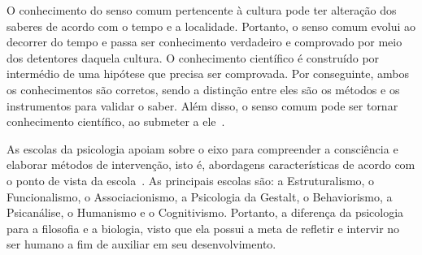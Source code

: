 O conhecimento do senso comum pertencente à cultura pode ter alteração dos saberes de acordo com o tempo e a localidade.
Portanto, o senso comum evolui ao decorrer do tempo e passa ser conhecimento verdadeiro e comprovado por meio dos detentores daquela cultura.
O conhecimento científico é construído por intermédio de uma hipótese que precisa ser comprovada. 
Por conseguinte, ambos os conhecimentos são corretos, sendo a distinção entre eles são os métodos e os instrumentos para validar o saber.
Além disso, o senso comum pode ser tornar conhecimento científico, ao submeter a ele~\cite{marconi2003mep}.  

As escolas da psicologia apoiam sobre o eixo para compreender a consciência e elaborar métodos de intervenção, isto é, abordagens características de acordo com o ponto de vista da escola~\cite{freitas2008historia}.
As principais escolas são: a Estruturalismo, o Funcionalismo, o Associacionismo, a Psicologia da Gestalt, o Behaviorismo, a Psicanálise, o Humanismo e o Cognitivismo.
Portanto, a diferença da psicologia para a filosofia e a biologia, visto que ela possui a meta de  refletir e intervir no ser humano a fim de auxiliar em seu desenvolvimento.
